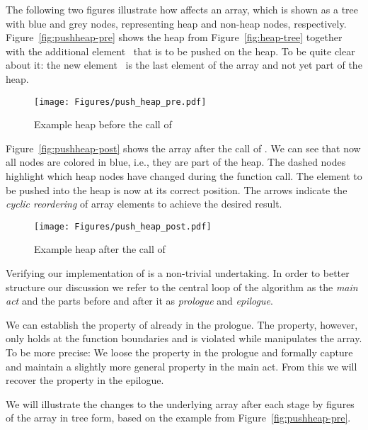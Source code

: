 The following two figures illustrate how \pushheap affects an array,
which is shown as a tree with blue and grey nodes, representing
heap and non-heap nodes, respectively.
Figure~\ref{fig:pushheap-pre} shows the heap from
Figure~\ref{fig:heap-tree} together with the additional element~ that
is to be pushed on the heap.
To be quite clear about it: the new element~ is the last element of the
array and not yet part of the heap.

\begin{figure}[hbt]
\centering
\texttt{[image: Figures/push\_heap\_pre.pdf]}
\caption{Example heap before the call of \pushheap}
\end{figure}

\FloatBarrier

Figure~\ref{fig:pushheap-post} shows the array
after the call of \pushheap.
We can see that now all nodes are colored in blue, i.e., they are part of the heap.
The dashed nodes highlight which heap nodes have changed during the function call.
The element to be pushed into the heap is now at its correct position.
The arrows indicate the \emph{cyclic reordering} of array elements to achieve the
desired result.

\begin{figure}[hbt]
\centering
\texttt{[image: Figures/push\_heap\_post.pdf]}
\caption{Example heap after the call of \pushheap}
\end{figure}

\FloatBarrier


Verifying our implementation of  is a non-trivial undertaking.
In order to better structure our discussion we refer to the central
loop of the algorithm as the \emph{main act} and the parts before and after
it as \emph{prologue} and \emph{epilogue}.

We can establish the  property of 
already in the prologue.
The  property, however, only holds at the function boundaries
and is violated while \pushheap manipulates the array.
To be more precise:
We loose the  property in the prologue and
formally capture and maintain a slightly more general property
in the main act.
From this we will recover the  property in the epilogue.

We will illustrate the changes to the underlying array after each stage 
by figures of the array in tree form,
based on the \pushheap example from Figure~\ref{fig:pushheap-pre}.

